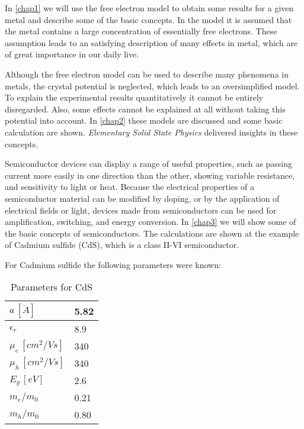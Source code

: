 In \ref{chap1}  we will use the free electron model to obtain some results for a given metal and describe some of the basic concepts. In the model it is assumed that the metal contains a large concentration of essentially free electrons. These assumption leads to an satisfying description of many effects in metal, which are of great importance in our daily live.

Although the free electron model can be used to describe many phenomena in metals, the crystal
potential is neglected, which leads to an oversimplified model. To explain the experimental results quantitatively it cannot be entirely disregarded. Also, some effects cannot be explained at all without taking this potential into account. In \ref{chap2}  these models are discussed and some basic calculation are shown. \textit{Elementary Solid State Physics} \cite{elementary_SSP} delivered insights in these concepts.

Semiconductor devices can display a range of useful properties, such as passing current more easily in one direction than the other, showing variable resistance, and sensitivity to light or heat. Because the electrical properties of a semiconductor material can be modified by doping, or by the application of electrical fields or light, devices made from semiconductors can be used for amplification, switching, and energy conversion. In \ref{chap3}  we will show some of the basic concepts of semiconductors. The calculations are shown at the example of Cadmium sulfide (CdS), which is a class II-VI semiconductor.  


For Cadmium sulfide the following parameters were known:

\begin{table}[h]
    \centering
    \begin{tabular}{l|l}
     $a \, [\mathring{A}]$      & 5.82 \\ \hline
     $\epsilon_r$               & 8.9  \\ \hline
     $\mu_e \, [cm^2/Vs]$       & 340  \\ \hline
     $\mu_h \, [cm^2/Vs]$       & 340  \\ \hline
     $E_g \, [eV]$              & 2.6  \\ \hline
     $m_e/m_0$                  & 0.21 \\ \hline
     $m_h/m_0$                  & 0.80 \\ 
    \end{tabular}
    \caption{Parameters for CdS}
\end{table}
